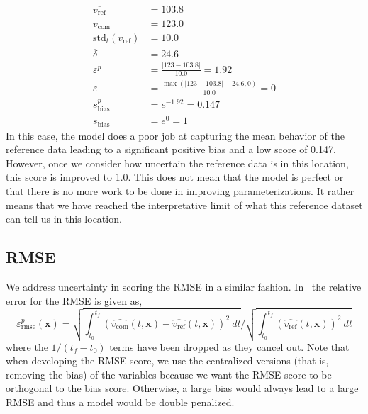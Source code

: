 \documentclass{agujournal}
\newcommand{\bx}{\mathbf{x}}
\begin{document}
\begin{subequations}
	\label{e:biasB}
	\begin{align}
		\overline{v_{\mathrm{ref}}}                 & = 103.8                                                       \\
		\overline{v_{\mathrm{com}}}                 & = 123.0                                                       \\
		\mathrm{std}_t\left(v_{\mathrm{ref}}\right) & = 10.0                                                        \\
		\overline{\delta}                           & = 24.6                                                        \\
		\varepsilon^{p}                             & = \frac{\left| 123- 103.8 \right|}{10.0}               = 1.92 \\
		\varepsilon                                 & = \frac{\max(\left| 123-103.8\right| - 24.6,0)}{10.0}  = 0    \\
		s^{p}_{\mathrm{bias}}                       & = e^{-1.92} = 0.147                                           \\
		s_{\mathrm{bias}}                           & = e^{0} = 1
	\end{align}
\end{subequations}
%
In this case, the model does a poor job at capturing the mean behavior of the reference data leading to a significant positive bias and a low score of 0.147. However, once we consider how uncertain the reference data is in this location, this score is improved to 1.0. This does not mean that the model is perfect or that there is no more work to be done in improving parameterizations. It rather means that we have reached the interpretative limit of what this reference dataset can tell us in this location.
%
\subsection{RMSE}
%
We address uncertainty in scoring the RMSE in a similar fashion. In~\cite{Collier_JAMES_20181101} the relative error for the RMSE is given as,
%
\begin{equation}
	\varepsilon^{p}_{\mathrm{rmse}}(\bx) =
	\sqrt{\int_{t_0}^{t_f}
		\left(\widehat{v_{\mathrm{com}}}(t,\bx)-\widehat{v_{\mathrm{ref}}}(t,\bx)\right)^2
		\ dt} \bigg/
	\sqrt{\int_{t_0}^{t_f}
		\left(\widehat{v_{\mathrm{ref}}}(t,\bx)\right)^2
		\ dt}
	\label{e:rmse0}
\end{equation}
%
where the $1/(t_f-t_0)$ terms have been dropped as they cancel out. Note that when developing the RMSE score, we use the centralized versions (that is, removing the bias) of the variables because we want the RMSE score to be orthogonal to the bias score. Otherwise, a large bias would always lead to a large RMSE and thus a model would be double penalized.
\end{document}
